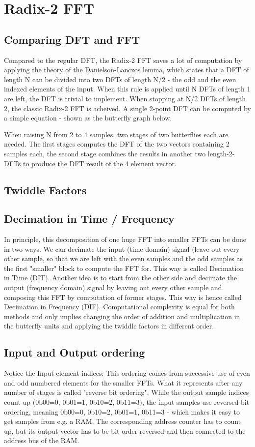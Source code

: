 \chapter{Radix-2 FFT}
\section{Comparing DFT and FFT}
Compared to the regular DFT, the Radix-2 FFT saves a lot of computation by applying the theory of the Danielson-Lanczos lemma, which states that a DFT of length N can be divided into two DFTs of length N/2 - the odd and the even indexed elements of the input. When this rule is applied until N DFTs of length 1 are left, the DFT is trivial to implement. When stopping at N/2 DFTs of length 2, the classic Radix-2 FFT is acheived. A single 2-point DFT can be computed by a simple equation - shown as the butterfly graph below.

When raising N from 2 to 4 samples, two stages of two butterflies each are needed. The first stages computes the DFT of the two vectors containing 2 samples each, the second stage combines the results in another two length-2-DFTs to produce the DFT result of the 4 element vector.

\section{Twiddle Factors}

\section{Decimation in Time / Frequency}
In principle, this decomposition of one huge FFT into smaller FFTs can be done in two ways. We can decimate the input (time domain) signal (leave out every other sample, so that we are left with the even samples and the odd samples as the first "smaller" block to compute the FFT for. This way is called Decimation in Time (DIT). Another idea is to start from the other side and decimate the output (frequency domain) signal by leaving out every other sample and composing this FFT by computation of former stages. This way is hence called Decimation in Frequency (DIF). Computational complexity is equal for both methods and only implies changing the order of addition and multiplication in the butterfly units and applying the twiddle factors in different order.

\section{Input and Output ordering}
Notice the Input element indices: This ordering comes from successive use of even and odd numbered elements for the smaller FFTs. What it represents after any number of stages is called "reverse bit ordering". While the output sample indices count up (0b00=0, 0b01=1, 0b10=2, 0b11=3), the input samples use reversed bit ordering, meaning 0b00=0, 0b10=2, 0b01=1, 0b11=3 - which makes it easy to get samples from e.g. a RAM. The corresponding address counter has to count up, but its output vector has to be bit order reversed and then connected to the address bus of the RAM.


